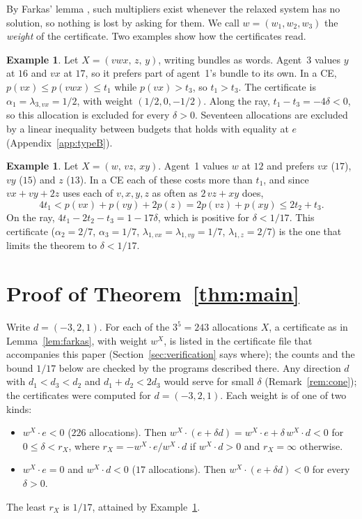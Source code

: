 \documentclass[11pt]{article}
\theoremstyle{definition}
\newtheorem{example}[theorem]{Example}
\theoremstyle{remark}
\begin{document}
By Farkas' lemma \cite{Sch}, such multipliers exist whenever the relaxed
system has no solution, so nothing is lost by asking for them. We call
$w=(w_1,w_2,w_3)$ the \emph{weight} of the certificate. Two examples show
how the certificates read.

\begin{example}\label{ex:envy}
Let $X=(vwx,\,z,\,y)$, writing bundles as words. Agent~3 values $y$ at $16$
and $vx$ at $17$, so it prefers part of agent~1's bundle to its own. In a
CE, $p(vx)\le p(vwx)\le t_1$ while $p(vx)>t_3$, so $t_1>t_3$. The
certificate is $\alpha_1=\lambda_{3,vx}=1/2$, with weight
$(1/2,0,-1/2)$. Along the ray, $t_1-t_3=-4\delta<0$, so this allocation is
excluded for every $\delta>0$. Seventeen allocations are excluded by a
linear inequality between budgets that holds with equality at $e$
(Appendix~\ref{app:typeB}).
\end{example}

\begin{example}\label{ex:bottleneck}
Let $X=(w,\,vz,\,xy)$. Agent~1 values $w$ at $12$ and prefers $vx$ ($17$),
$vy$ ($15$) and $z$ ($13$). In a CE each of these costs more than $t_1$,
and since $vx+vy+2z$ uses each of $v,x,y,z$ as often as $2\,vz+xy$ does,
\[
  4t_1< p(vx)+p(vy)+2p(z)=2p(vz)+p(xy)\le 2t_2+t_3 .
\]
On the ray, $4t_1-2t_2-t_3=1-17\delta$, which is positive for
$\delta<1/17$. This certificate ($\alpha_2=2/7$, $\alpha_3=1/7$,
$\lambda_{1,vx}=\lambda_{1,vy}=1/7$, $\lambda_{1,z}=2/7$) is the one that
limits the theorem to $\delta<1/17$.
\end{example}

\section{Proof of Theorem~\ref{thm:main}}

Write $d=(-3,2,1)$. For each of the $3^5=243$ allocations $X$, a
certificate as in Lemma~\ref{lem:farkas}, with weight $w^X$, is listed in
the certificate file that accompanies this paper
(Section~\ref{sec:verification} says where); the counts and the bound
$1/17$ below are checked by the programs described there. Any direction
$d$ with $d_1<d_3<d_2$ and $d_1+d_2<2d_3$ would serve for small $\delta$
(Remark~\ref{rem:cone}); the certificates were computed for
$d=(-3,2,1)$. Each weight is of one of two kinds:
\begin{itemize}
\item[(A)] $w^X\!\cdot e<0$ ($226$ allocations). Then
$w^X\!\cdot(e+\delta d)=w^X\!\cdot e+\delta\,w^X\!\cdot d<0$ for
$0\le\delta<r_X$, where $r_X=-w^X\!\cdot e/w^X\!\cdot d$ if
$w^X\!\cdot d>0$ and $r_X=\infty$ otherwise.
\item[(B)] $w^X\!\cdot e=0$ and $w^X\!\cdot d<0$ ($17$ allocations). Then
$w^X\!\cdot(e+\delta d)<0$ for every $\delta>0$.
\end{itemize}
The least $r_X$ is $1/17$, attained by Example~\ref{ex:bottleneck}.
\end{document}
